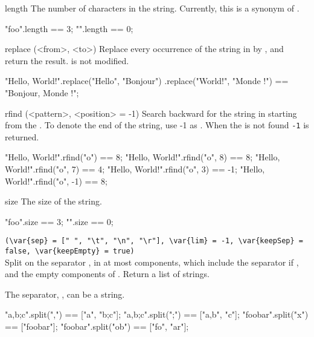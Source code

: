 \begin{urbiscriptapi}
\item[length] The number of characters in the string.  Currently, this is a
  synonym of .
\begin{urbiassert}
"foo".length == 3;
   "".length == 0;
\end{urbiassert}


\item[replace](<from>, <to>)%
  Replace every occurrence of the string  in \this by ,
  and return the result.  \this is not modified.
\begin{urbiassert}
"Hello, World!".replace("Hello", "Bonjour")
                      .replace("World!", "Monde !") ==
       "Bonjour, Monde !";
\end{urbiassert}


\item[rfind](<pattern>, <position> = -1)%
  Search backward for the  string in \this starting from the
  .  To denote the end of the string, use -1 as
  .  When the  is not found \lstinline|-1| is
  returned.
\begin{urbiassert}
"Hello, World!".rfind("o")     == 8;
"Hello, World!".rfind("o", 8)  == 8;
"Hello, World!".rfind("o", 7)  == 4;
"Hello, World!".rfind("o", 3)  == -1;
"Hello, World!".rfind("o", -1) == 8;
\end{urbiassert}


\item[size]
  The size of the string.
\begin{urbiassert}
"foo".size == 3;
   "".size == 0;
\end{urbiassert}


\item {}%
  \lstinline|(\var{sep} = [" ", "\t", "\n", "\r"], \var{lim} = -1, \var{keepSep} = false, \var{keepEmpty} = true)|\\
  Split \this on the separator , in at most 
  components, which include the separator if , and the
  empty components of .  Return a list of strings.

  The separator, , can be a string.

\begin{urbiassert}
       "a,b;c".split(",") == ["a", "b;c"];
       "a,b;c".split(";") == ["a,b", "c"];
      "foobar".split("x") == ["foobar"];
     "foobar".split("ob") == ["fo", "ar"];
\end{urbiassert}


\end{urbiscriptapi}
